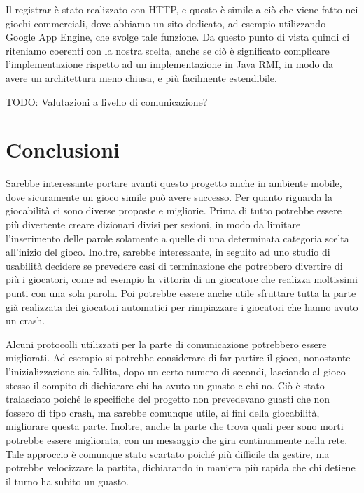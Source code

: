 \documentclass[10.5pt]{article}
\begin{document}
Il registrar è stato realizzato con HTTP, e questo è simile a ciò che viene fatto nei giochi commerciali, dove abbiamo un sito dedicato, ad esempio utilizzando Google App Engine, che svolge tale funzione. Da questo punto di vista quindi ci riteniamo coerenti con la nostra scelta, anche se ciò è significato complicare l'implementazione rispetto ad un implementazione in Java RMI, in modo da avere un architettura meno chiusa, e più facilmente estendibile.

TODO: Valutazioni a livello di comunicazione?

\section{Conclusioni}


Sarebbe interessante portare avanti questo progetto anche in ambiente mobile, dove sicuramente un gioco simile può avere successo. Per quanto riguarda la giocabilità ci sono diverse proposte e migliorie. Prima di tutto potrebbe essere più divertente creare dizionari divisi per sezioni, in modo da limitare l'inserimento delle parole solamente a quelle di una determinata categoria scelta all'inizio del gioco. Inoltre, sarebbe interessante, in seguito ad uno studio di usabilità decidere se prevedere casi di terminazione che potrebbero divertire di più i giocatori, come ad esempio la vittoria di un giocatore che realizza moltissimi punti con una sola parola. Poi potrebbe essere anche utile sfruttare tutta la parte già realizzata dei giocatori automatici per rimpiazzare i giocatori che hanno avuto un crash.

Alcuni protocolli utilizzati per la parte di comunicazione potrebbero essere migliorati. Ad esempio si potrebbe considerare di far partire il gioco, nonostante l'inizializzazione sia fallita, dopo un certo numero di secondi, lasciando al gioco stesso il compito di dichiarare chi ha avuto un guasto e chi no. Ciò è stato tralasciato poiché le specifiche del progetto non prevedevano guasti che non fossero di tipo crash, ma sarebbe comunque utile, ai fini della giocabilità, migliorare questa parte. Inoltre, anche la parte che trova quali peer sono morti potrebbe essere migliorata, con un messaggio che gira continuamente nella rete. Tale approccio è comunque stato scartato poiché più difficile da gestire, ma potrebbe velocizzare la partita, dichiarando in maniera più rapida che chi detiene il turno ha subito un guasto.




\end{document}
